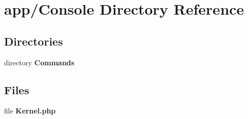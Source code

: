 \section{app/\+Console Directory Reference}
\label{dir_03779b48f42c705a8b5a3593301b3b80}
\subsection*{Directories}
\begin{DoxyCompactItemize}
\item 
directory {\bf Commands}
\end{DoxyCompactItemize}
\subsection*{Files}
\begin{DoxyCompactItemize}
\item 
file {\bf Kernel.\+php}
\end{DoxyCompactItemize}
